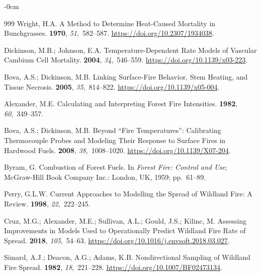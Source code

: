 \documentclass[fire,article,accept,oneauthor,pdftex]{Definitions/mdpi}
\begin{document}
\begin{adjustwidth}{-\extralength}{0cm}
\begin{thebibliography}{999}
Wright, H.A.
\newblock A {{Method}} to {{Determine Heat-Caused Mortality}} in
  {{Bunchgrasses}}.
 {\bf 1970}, {\em 51},~582--587.
\newblock
  \url{https://doi.org/10.2307/1934038}.

Dickinson, M.B.; Johnson, E.A.
\newblock Temperature-Dependent Rate Models of Vascular Cambium Cell Mortality.
 {\bf 2004}, {\em
  34},~546--559.
\newblock
  \url{https://doi.org/10.1139/x03-223}.

Bova, A.S.; Dickinson, M.B.
\newblock Linking Surface-Fire Behavior, Stem Heating, and Tissue Necrosis.
 {\bf 2005}, {\em
  35},~814--822.
\newblock
  \url{https://doi.org/10.1139/x05-004}.

Alexander, M.E.
\newblock Calculating and Interpreting Forest Fire Intensities.
 {\bf 1982}, {\em 60},~349--357.

Bova, A.S.; Dickinson, M.B.
\newblock Beyond ``Fire Temperatures'': Calibrating Thermocouple Probes and
  Modeling Their Response to Surface Fires in Hardwood Fuels.
 {\bf 2008}, {\em
  38},~1008--1020.
\newblock
  \url{https://doi.org/10.1139/X07-204}.

Byram, G.
\newblock Combustion of Forest Fuels.
\newblock In {\em Forest Fire: Control and Use}; McGraw-Hill Book Company Inc.: London, UK,
 {1959}; pp.~61--89.

Perry, G.L.W.
\newblock Current Approaches to Modelling the Spread of Wildland Fire: A
  Review.
 {\bf 1998}, {\em 22},~222--245.

Cruz, M.G.; Alexander, M.E.; Sullivan, A.L.; Gould, J.S.; Kilinc, M.
\newblock Assessing Improvements in Models Used to Operationally Predict
  Wildland Fire Rate of Spread.
 {\bf 2018}, {\em
  105},~54--63.
\newblock
  \url{https://doi.org/10.1016/j.envsoft.2018.03.027}.

Simard, A.J.; Deacon, A.G.; Adams, K.B.
\newblock Nondirectional Sampling of Wildland Fire Spread.
 {\bf 1982}, {\em 18},~221--228.
\newblock
  \url{https://doi.org/10.1007/BF02473134}.


\end{thebibliography}
\end{adjustwidth}
\end{document}
